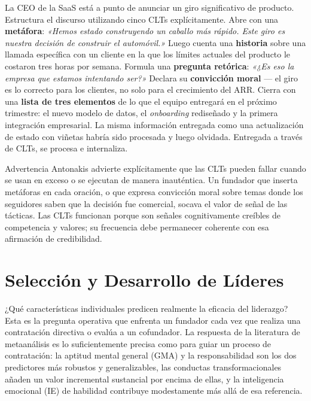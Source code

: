 \begin{example}
La CEO de la SaaS está a punto de anunciar un giro significativo de producto. Estructura el
discurso utilizando cinco CLTs explícitamente. Abre con una \textbf{metáfora}: \emph{«Hemos
estado construyendo un caballo más rápido. Este giro es nuestra decisión de construir el
automóvil.»} Luego cuenta una \textbf{historia} sobre una llamada específica con un cliente en
la que los límites actuales del producto le costaron tres horas por semana. Formula una
\textbf{pregunta retórica}: \emph{«¿Es eso la empresa que estamos intentando ser?»} Declara su
\textbf{convicción moral} --- el giro es lo correcto para los clientes, no solo para el
crecimiento del ARR. Cierra con una \textbf{lista de tres elementos} de lo que el equipo
entregará en el próximo trimestre: el nuevo modelo de datos, el \emph{onboarding} rediseñado y
la primera integración empresarial. La misma información entregada como una actualización de
estado con viñetas habría sido procesada y luego olvidada. Entregada a través de CLTs, se
procesa e internaliza.
\end{example}

\begin{admonition}{Advertencia}
Antonakis advierte explícitamente que las CLTs pueden fallar cuando se usan en exceso o se
ejecutan de manera inauténtica. Un fundador que inserta metáforas en cada oración, o que expresa
convicción moral sobre temas donde los seguidores saben que la decisión fue comercial, socava el
valor de señal de las tácticas. Las CLTs funcionan porque son señales cognitivamente creíbles de
competencia y valores; su frecuencia debe permanecer coherente con esa afirmación de
credibilidad.
\end{admonition}

\section{Selección y Desarrollo de Líderes}\label{sec:leader-selection}

¿Qué características individuales predicen realmente la eficacia del liderazgo? Esta es la
pregunta operativa que enfrenta un fundador cada vez que realiza una contratación directiva o
evalúa a un cofundador. La respuesta de la literatura de metaanálisis es lo suficientemente
precisa como para guiar un proceso de contratación: la aptitud mental general (GMA) y la
responsabilidad son los dos predictores más robustos y generalizables, las conductas
transformacionales añaden un valor incremental sustancial por encima de ellas, y la inteligencia
emocional (IE) de habilidad contribuye modestamente más allá de esa referencia.

